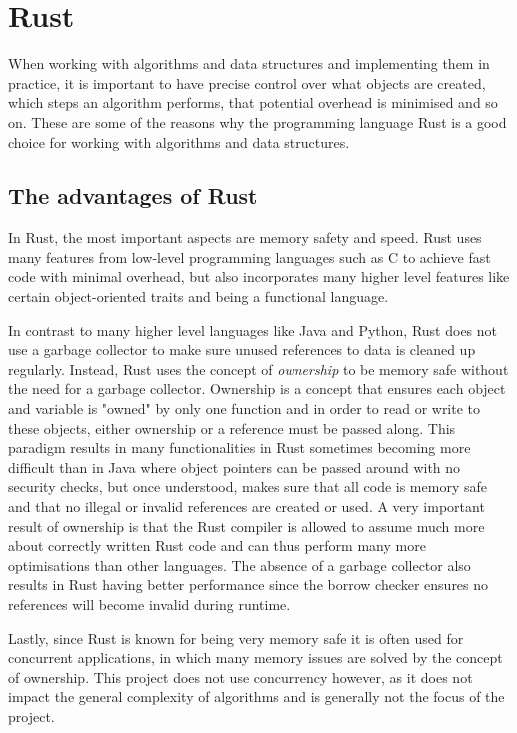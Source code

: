\chapter{Rust}

When working with algorithms and data structures and implementing them in practice, it is important to have precise control over what objects are created, which steps an algorithm performs, that potential overhead is minimised and so on. These are some of the reasons why the programming language Rust is a good choice for working with algorithms and data structures. 

\section{The advantages of Rust}

In Rust, the most important aspects are memory safety and speed. Rust uses many features from low-level programming languages such as C to achieve fast code with minimal overhead, but also incorporates many higher level features like certain object-oriented traits and being a functional language\cite{Rust}. 

In contrast to many higher level languages like Java and Python, Rust does not use a garbage collector to make sure unused references to data is cleaned up regularly. Instead, Rust uses the concept of \textit{ownership} to be memory safe without the need for a garbage collector\cite{Rust}. Ownership is a concept that ensures each object and variable is "owned" by only one function and in order to read or write to these objects, either ownership or a reference must be passed along. This paradigm results in many functionalities in Rust sometimes becoming more difficult than in Java where object pointers can be passed around with no security checks, but once understood, makes sure that all code is memory safe and that no illegal or invalid references are created or used. A very important result of ownership is that the Rust compiler is allowed to assume much more about correctly written Rust code and can thus perform many more optimisations than other languages. The absence of a garbage collector also results in Rust having better performance since the borrow checker ensures no references will become invalid during runtime\cite{Rust}. 

Lastly, since Rust is known for being very memory safe it is often used for concurrent applications, in which many memory issues are solved by the concept of ownership. This project does not use concurrency however, as it does not impact the general complexity of algorithms and is generally not the focus of the project. 


